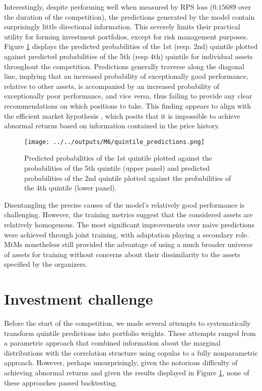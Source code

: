 \documentclass[3p,times,twocolumn]{elsarticle}
\begin{document}
Interestingly, despite performing well when measured by RPS loss ($0.15689$ over the duration of the competition), the predictions generated by the model contain surprisingly little directional information.
This severely limits their practical utility for forming investment portfolios, except for risk management purposes.
Figure \ref{fig:quintile_plots} displays the predicted probabilities of the 1st (resp. 2nd) quintile plotted against predicted probabilities of the 5th (resp 4th) quintile for individual assets throughout the competition.
Predictions generally traverse along the diagonal line, implying that an increased probability of exceptionally good performance, relative to other assets, is accompanied by an increased probability of exceptionally poor performance, and vice versa, thus failing to provide any clear recommendations on which positions to take.
This finding appears to align with the efficient market hypothesis \citep[see, e.g.,][]{malkielReflectionsEfficientMarket2005}, which posits that it is impossible to achieve abnormal returns based on information contained in the price history.

\begin{figure}[!htbp]
    \centering
    \texttt{[image: ../../outputs/M6/quintile\_predictions.png]}
    \caption{
        Predicted probabilities of the 1st quintile plotted against the probabilities of the 5th quintile (upper panel) and predicted probabilities of the 2nd quintile plotted against the probabilities of the 4th quintile (lower panel).
    }
    \label{fig:quintile_plots}
\end{figure}

Disentangling the precise causes of the model's relatively good performance is challenging. 
However, the training metrics suggest that the considered assets are relatively homogenous. 
The most significant improvements over naive predictions were achieved through joint training, with adaptation playing a secondary role. 
MtMs nonetheless still provided the advantage of using a much broader universe of assets for training without concerns about their dissimilarity to the assets specified by the organizers.

\section{Investment challenge}\label{section:investment_challenge}

Before the start of the competition, we made several attempts to systematically transform quintile predictions into portfolio weights.
These attempts ranged from a parametric approach that combined information about the marginal distributions with the correlation structure using copulas to a fully nonparametric approach. 
However, perhaps unsurprisingly, given the notorious difficulty of achieving abnormal returns and given the results displayed in Figure \ref{fig:quintile_plots}, none of these approaches passed backtesting.
\end{document}
